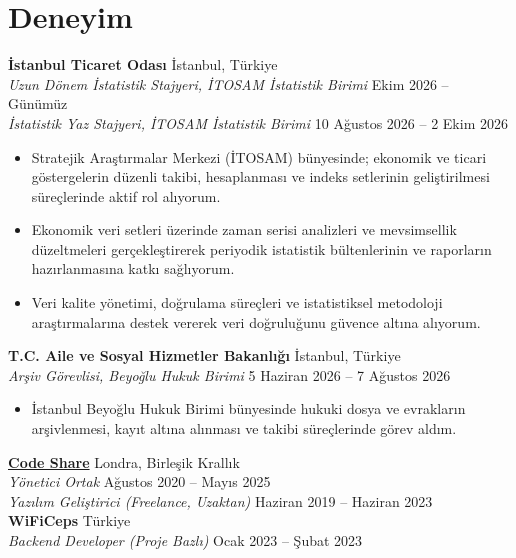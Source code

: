 \documentclass[10pt,a4paper]{extarticle}
\begin{document}
\section{Deneyim}
\textbf{İstanbul Ticaret Odası} \hfill İstanbul, Türkiye\\
\textit{Uzun Dönem İstatistik Stajyeri, İTOSAM İstatistik Birimi} \hfill Ekim 2026 -- Günümüz\\
\textit{İstatistik Yaz Stajyeri, İTOSAM İstatistik Birimi} \hfill 10 Ağustos 2026 -- 2 Ekim 2026
\begin{itemize}[leftmargin=*,noitemsep,topsep=0pt]
    \item Stratejik Araştırmalar Merkezi (İTOSAM) bünyesinde; ekonomik ve ticari göstergelerin düzenli takibi, hesaplanması ve indeks setlerinin geliştirilmesi süreçlerinde aktif rol alıyorum.
    \item Ekonomik veri setleri üzerinde zaman serisi analizleri ve mevsimsellik düzeltmeleri gerçekleştirerek periyodik istatistik bültenlerinin ve raporların hazırlanmasına katkı sağlıyorum.
    \item Veri kalite yönetimi, doğrulama süreçleri ve istatistiksel metodoloji araştırmalarına destek vererek veri doğruluğunu güvence altına alıyorum.
\end{itemize}
\textbf{T.C. Aile ve Sosyal Hizmetler Bakanlığı} \hfill İstanbul, Türkiye\\
\textit{Arşiv Görevlisi, Beyoğlu Hukuk Birimi} \hfill 5 Haziran 2026 -- 7 Ağustos 2026
\begin{itemize}[leftmargin=*,noitemsep,topsep=0pt]
    \item İstanbul Beyoğlu Hukuk Birimi bünyesinde hukuki dosya ve evrakların arşivlenmesi, kayıt altına alınması ve takibi süreçlerinde görev aldım.
\end{itemize}
\textbf{\href{https://codeshare.me}{Code Share}} \hfill Londra, Birleşik Krallık\\
\textit{Yönetici Ortak} \hfill Ağustos 2020 -- Mayıs 2025\\
\textit{Yazılım Geliştirici (Freelance, Uzaktan)} \hfill Haziran 2019 -- Haziran 2023\\[6pt]
\textbf{WiFiCeps} \hfill Türkiye\\
\textit{Backend Developer (Proje Bazlı)} \hfill Ocak 2023 -- Şubat 2023
\end{document}
